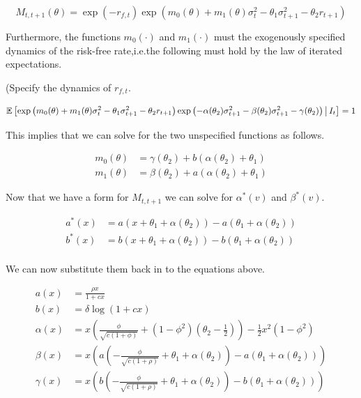 \documentclass[11pt]{article}
\newcommand*{\E}{\mathbb{E}}
\newcommand{\mvert}[1][\middle]{\ensuremath{\,#1\vert\,}}
\begin{document}
\begin{equation}
    M_{t,t+1}(\theta) = \exp(-r_{f,t}) \exp\left(m_{0}(\theta) + m_1(\theta) \sigma_t^2 - \theta_1 \sigma^2_{t+1}
    - \theta_2 r_{t+1}\right)
\end{equation}

Furthermore, the functions $m_0(\cdot)$ and $m_1(\cdot)$ must the exogenously specified dynamics of the risk-free
rate,i.e.\@ the following must hold by the law of iterated expectations.

(Specify the dynamics of $r_{f,t}$.

\begin{equation}
    \E \left[\exp\left(m_{0}(\theta) + m_1(\theta) \sigma_t^2 - \theta_1 \sigma^2_{t+1} - \theta_2 r_{t+1}\right)
    \exp\left(- \alpha(\theta_2) \sigma^2_{t+1} - \beta (\theta_2) \sigma^2_{t+1} - \gamma(\theta_2)\right) \mvert
    I_t \right] = 1
\end{equation}

This implies that we can solve for the two unspecified functions as follows.

\begin{align}
    m_{0}(\theta) &= \gamma(\theta_2) + b\left(\alpha\left(\theta_2\right) + \theta_1\right) \\
    m_{1}(\theta) &= \beta(\theta_2) + a\left(\alpha(\theta_2) + \theta_1\right) 
\end{align}

Now that we have a form for $M_{t,t+1}$ we can solve for $\alpha^{*}(v)$ and $\beta^{*}(v)$. 

\begin{align}
    a^{*}(x) &= a\left(x + \theta_1 + \alpha(\theta_2)\right) - a\left(\theta_1 + \alpha(\theta_2)\right) \\
    b^{*}(x) &= b\left(x + \theta_1 + \alpha(\theta_2)\right) - b\left(\theta_1 + \alpha(\theta_2)\right) \\
\end{align}


We can now substitute them back in to the equations above.


\begin{align}
    a(x) &= \frac{\rho x}{1 + c x} \\ \label{eqn:a(x)}
    b(x) &= \delta \log \left(1 + c x\right) \\ \label{eqn:b(x)}
    \alpha(x) &= x \left(\frac{\phi}{\sqrt{c (1 + \phi)}}  + (1 - \phi^2)\left(\theta_2 - \frac{1}{2}\right)\right)
    - \frac{1}{2} x^2 (1 - \phi^2) \\ \label{eqn:alpha(x)}
    \beta(x)  &= x \left(a\left(-\frac{\phi}{\sqrt{c(1+ \rho)}} + \theta_1 + \alpha(\theta_2)\right) -
        a\left(\theta_1 + \alpha(\theta_2)\right)\right) \\ \label{eqn:beta(x)}
    \gamma(x) &= x \left(b\left(-\frac{\phi}{\sqrt{c(1+\rho)}} + \theta_1 + \alpha(\theta_2)\right) -
        b\left(\theta_1 + \alpha(\theta_2)\right) \right)
\end{align}
\end{document}
